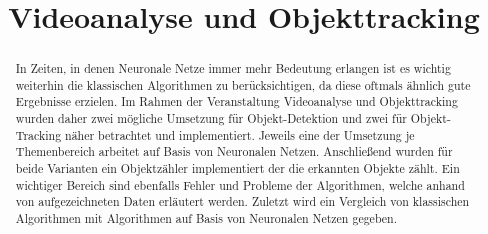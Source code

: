 \documentclass[conference]{IEEEtran}
\begin{document}
	
	\title{Videoanalyse und Objekttracking}
	
	\author{
		\and
		\and
	}
	
	
	\maketitle
	
	\begin{abstract}
		In Zeiten, in denen Neuronale Netze immer mehr Bedeutung erlangen ist es wichtig weiterhin die klassischen Algorithmen zu berücksichtigen, da diese oftmals ähnlich gute Ergebnisse erzielen. Im Rahmen der Veranstaltung Videoanalyse und Objekttracking wurden daher zwei mögliche Umsetzung für Objekt-Detektion und zwei für Objekt-Tracking näher betrachtet und implementiert. Jeweils eine der Umsetzung je Themenbereich arbeitet auf Basis von Neuronalen Netzen. Anschließend wurden für beide Varianten ein Objektzähler implementiert der die erkannten Objekte zählt. Ein wichtiger Bereich sind ebenfalls Fehler und Probleme der Algorithmen, welche anhand von aufgezeichneten Daten erläutert werden. Zuletzt wird ein Vergleich von klassischen Algorithmen mit Algorithmen auf Basis von Neuronalen Netzen gegeben.
	\end{abstract}
	
	
\end{document}
